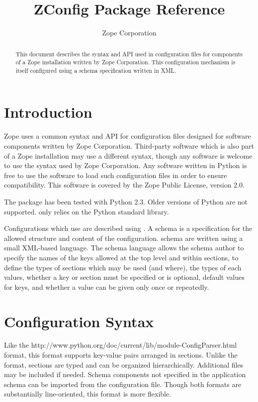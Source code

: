 \documentclass{howto}
\title{ZConfig Package Reference}
\author{Zope Corporation}
\begin{document}
\maketitle

\begin{abstract}
\noindent
This document describes the syntax and API used in configuration files
for components of a Zope installation written by Zope Corporation.  This
configuration mechanism is itself configured using a schema specification
written in XML.
\end{abstract}

\tableofcontents


\section{Introduction \label{intro}}

Zope uses a common syntax and API for configuration files designed for
software components written by Zope Corporation.  Third-party software
which is also part of a Zope installation may use a different syntax,
though any software is welcome to use the syntax used by Zope
Corporation.  Any software written in Python is free to use the
 software to load such configuration files in order to
ensure compatibility.  This software is covered by the Zope Public
License, version 2.0.

The  package has been tested with Python 2.3.  Older
versions of Python are not supported.
 only relies on the Python standard library.

Configurations which use  are described using
.  A schema is a specification for the allowed structure
and content of the configuration.   schema are written
using a small XML-based language.  The schema language allows the
schema author to specify the names of the keys allowed at the top
level and within sections, to define the types of sections which may
be used (and where), the types of each values, whether a key or
section must be specified or is optional, default values for keys, and
whether a value can be given only once or repeatedly.


\section{Configuration Syntax \label{syntax}}

Like the 
{http://www.python.org/doc/current/lib/module-ConfigParser.html}
format, this format supports key-value pairs arranged in sections.
Unlike the  format, sections are typed and can be
organized hierarchically.
Additional files may be included if needed.  Schema components not
specified in the application schema can be imported from the
configuration file.  Though both formats are substantially
line-oriented, this format is more flexible.
\end{document}
